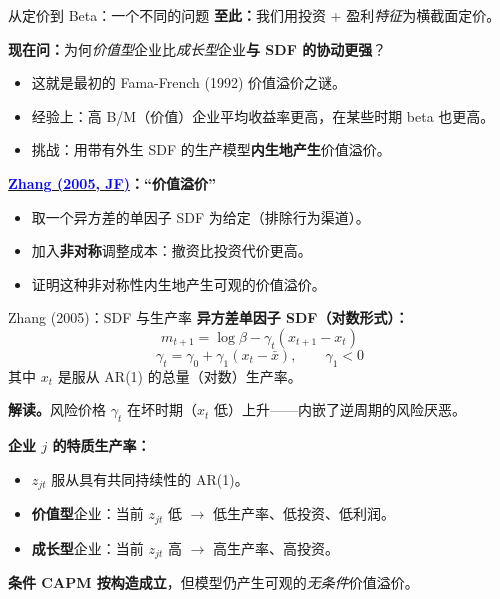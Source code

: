 \documentclass{beamer}
\begin{document}
\begin{frame}{从定价到 Beta：一个不同的问题}
    \textbf{至此：}我们用投资 + 盈利\textit{特征}为横截面定价。

    \vspace{0.2cm}
    \textbf{现在问：}为何\textit{价值型}企业比\textit{成长型}企业\textbf{与 SDF 的协动更强}？
    \begin{itemize}
        \item 这就是最初的 Fama-French (1992) 价值溢价之谜。
        \item 经验上：高 B/M（价值）企业平均收益率更高，在某些时期 beta 也更高。
        \item 挑战：用带有外生 SDF 的生产模型\textbf{内生地产生}价值溢价。
    \end{itemize}

    \vspace{0.2cm}
    \textbf{\href{https://doi.org/10.1111/j.1540-6261.2004.00709.x}{\textcolor{blue}{Zhang (2005, JF)}}：“价值溢价”}
    \begin{itemize}
        \item 取一个异方差的单因子 SDF 为给定（排除行为渠道）。
        \item 加入\textbf{非对称}调整成本：撤资比投资代价更高。
        \item 证明这种非对称性内生地产生可观的价值溢价。
    \end{itemize}
\end{frame}

\begin{frame}{Zhang (2005)：SDF 与生产率}
    \textbf{异方差单因子 SDF（对数形式）：}
    \begin{equation}\label{equ:zhang sdf}
        m_{t+1} = \log\beta - \gamma_t (x_{t+1} - x_t)
    \end{equation}
    \begin{equation}\label{equ:zhang gamma}
        \gamma_t = \gamma_0 + \gamma_1 (x_t - \bar{x}), \qquad \gamma_1 < 0
    \end{equation}
    其中 $x_t$ 是服从 AR(1) 的总量（对数）生产率。

    \textbf{解读。}风险价格 $\gamma_t$ 在坏时期（$x_t$ 低）上升——内嵌了逆周期的风险厌恶。

    \vspace{0.2cm}
    \textbf{企业 $j$ 的特质生产率：}
    \begin{itemize}
        \item $z_{jt}$ 服从具有共同持续性的 AR(1)。
        \item \textbf{价值型}企业：当前 $z_{jt}$ 低 $\rightarrow$ 低生产率、低投资、低利润。
        \item \textbf{成长型}企业：当前 $z_{jt}$ 高 $\rightarrow$ 高生产率、高投资。
    \end{itemize}

    \vspace{0.2cm}
    \textbf{条件 CAPM 按构造成立}，但模型仍产生可观的\textit{无条件}价值溢价。
\end{frame}
\end{document}

